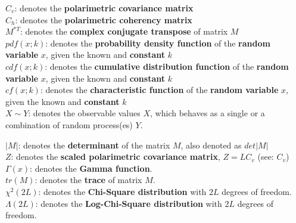 \documentclass[a4paper, oneside, 11pt]{Latex/Classes/PhDthesisPSnPDF}
\begin{document}
\begin{multicols}{2} %

$C_v$: denotes the {\bf polarimetric covariance matrix}\\

$C_h$: denotes the {\bf polarimetric coherency matrix}\\

$M^{*T}$: denotes the {\bf complex conjugate transpose} of matrix $M$ \\

$pdf(x;k)$: denotes the {\bf probability density function} of the {\bf random variable} $x$,
  given the known and {\bf constant} $k$\\

$cdf(x;k)$: denotes the {\bf cumulative distribution function} of the {\bf random variable} $x$,
  given the known and {\bf constant} $k$\\  

$cf(x;k)$: denotes the {\bf characteristic function} of the {\bf random variable} $x$,
  given the known and {\bf constant} $k$\\  

$X \sim Y$: denotes the observable values $X$,
  which behaves as a single or a combination of random process(es) $Y$. 
  
$|M|$: denotes the {\bf determinant} of the matrix $M$, also denoted as $det|M|$\\

$Z$: denotes the {\bf scaled polarimetric covariance matrix}, $Z=LC_v$ (see: $C_v$)\\

$\Gamma(x)$: denotes the {\bf Gamma function}.\\

$tr(M)$: denotes the {\bf trace} of matrix $M$.\\

$\chi^2(2L)$: denotes the {\bf Chi-Square distribution} with $2L$ degrees of freedom.\\

$\Lambda(2L)$: denotes the {\bf Log-Chi-Square distribution} with $2L$ degrees of freedom.\\
  
  
\end{multicols}
\end{document}
